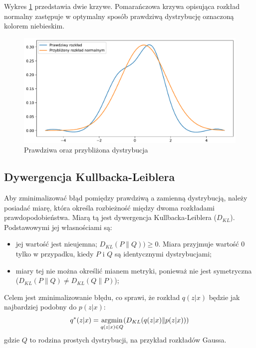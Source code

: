 \documentclass[a4paper,12pt,oneside]{book} %
\begin{document}
Wykres \ref{fig:app} przedstawia dwie krzywe. Pomarańczowa krzywa opisująca rozkład normalny zastępuje w optymalny sposób prawdziwą dystrybucję oznaczoną kolorem niebieskim.
\begin{figure}[h!]
	\centering
	\includegraphics[width=12cm]{approximate.pdf}
	\caption{Prawdziwa oraz przybliżona dystrybucja}
		\label{fig:app}
\end{figure} 

\subsection{Dywergencja Kullbacka-Leiblera}
Aby zminimalizować błąd pomiędzy prawdziwą a zamienną dystrybucją, należy posiadać miarę, która określa rozbieżność między dwoma rozkładami prawdopodobieństwa. Miarą tą jest dywergencja Kullbacka-Leiblera ($D_{KL}$). Podstawowymi jej własnościami są:
\begin{itemize}
	\item jej wartość jest nieujemna; $D_{KL}(P\|Q)) \geq 0$. Miara przyjmuje wartość 0 tylko w przypadku, kiedy $P$ i $Q$ są identycznymi dystrybucjami;
	\item miary tej nie można określić mianem metryki, ponieważ nie jest symetryczna ($D_{KL}(P\|Q)\neq D_{KL}(Q\|P)$);
\end{itemize}
Celem jest zminimalizowanie błędu, co sprawi, że rozkład $q(z|x)$ będzie jak najbardziej podobny do $p(z|x)$:
\begin{equation}
	q^\ast(z|x)=\operatorname*{argmin}_{q(z|x)\in Q}(D_{KL}(q(z|x)\|p(z|x)))\\
		\label{qopt}
\end{equation}
gdzie $Q$ to rodzina prostych dystrybucji, na przykład rozkładów Gaussa.
\end{document}
